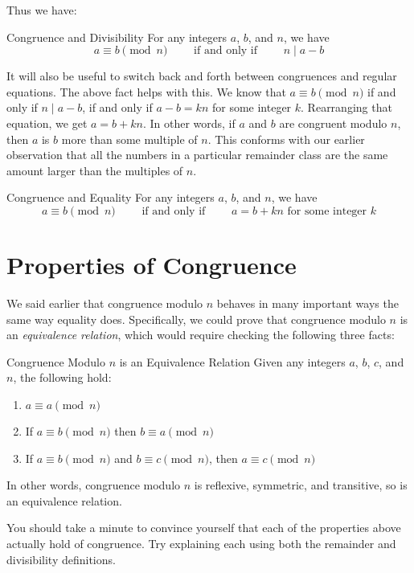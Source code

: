 \documentclass[12pt]{article}
\begin{document}
Thus we have:

\begin{defbox}{Congruence and Divisibility}
	For any integers $a$, $b$, and $n$, we have
	\[a \equiv b \pmod{n} \qquad \mbox{ if and only if } \qquad n \mid a-b\]
\end{defbox}

It will also be useful to switch back and forth between congruences and regular equations.  The above fact helps with this.  We know that $a \equiv b \pmod{n}$ if and only if $n \mid a-b$, if and only if $a-b = kn$ for some integer $k$.  Rearranging that equation, we get $a = b + kn$.  In other words, if $a$ and $b$ are congruent modulo $n$, then $a$ is $b$ more than some multiple of $n$.  This conforms with our earlier observation that all the numbers in a particular remainder class are the same amount larger than the multiples of $n$.

\begin{defbox}{Congruence and Equality}
	For any integers $a$, $b$, and $n$, we have
	\[a \equiv b \pmod{n} \qquad \mbox{ if and only if } \qquad a = b + kn \mbox{ for some integer $k$}\]
\end{defbox}

\section{Properties of Congruence}

We said earlier that congruence modulo $n$ behaves in many important ways the same way equality does.  Specifically, we could prove that congruence modulo $n$ is an {\em equivalence relation}, which would require checking the following three facts:

\begin{defbox}{Congruence Modulo $n$ is an Equivalence Relation}
	Given any integers $a$, $b$, $c$, and $n$, the following hold:
	\begin{enumerate}
		\item $a \equiv a \pmod{n}$ 
		\item If $a \equiv b \pmod{n}$ then $b \equiv a \pmod{n}$
		\item If $a \equiv b \pmod{n}$ and $b \equiv c \pmod{n}$, then $a \equiv c \pmod{n}$ 
	\end{enumerate}
	In other words, congruence modulo $n$ is reflexive, symmetric, and transitive, so is an equivalence relation.
\end{defbox}

You should take a minute to convince yourself that each of the properties above actually hold of congruence.  Try explaining each using both the remainder and divisibility definitions.
\end{document}
